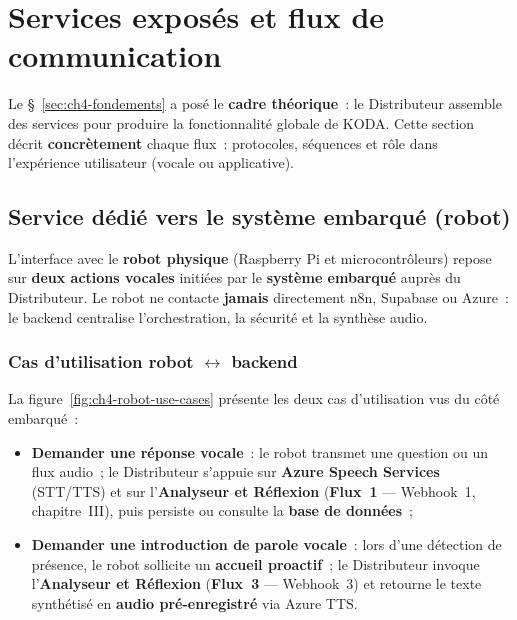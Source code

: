 \documentclass[a4paper,12pt]{report}
\begin{document}
	\section{Services exposés et flux de communication}
	\label{sec:ch4-services}
	
	Le §~\ref{sec:ch4-fondements} a posé le \textbf{cadre théorique}~: le Distributeur
	assemble des services pour produire la fonctionnalité globale de KODA. Cette section
	décrit \textbf{concrètement} chaque flux~: protocoles, séquences et rôle dans
	l'expérience utilisateur (vocale ou applicative).
	
	\subsection{Service dédié vers le système embarqué (robot)}
	\label{sec:ch4-robot-interaction}
	
	L'interface avec le \textbf{robot physique} (Raspberry Pi et microcontrôleurs) repose
	sur \textbf{deux actions vocales} initiées par le \textbf{système embarqué} auprès du
	Distributeur. Le robot ne contacte \textbf{jamais} directement n8n, Supabase ou Azure~:
	le backend centralise l'orchestration, la sécurité et la synthèse audio.
	
	\subsubsection{Cas d'utilisation robot $\leftrightarrow$ backend}
	
	La figure~\ref{fig:ch4-robot-use-cases} présente les deux cas d'utilisation vus du
	côté embarqué~:
	\begin{itemize}[noitemsep]
		\item \textbf{Demander une réponse vocale}~: le robot transmet une question ou un
		flux audio~; le Distributeur s'appuie sur \textbf{Azure Speech Services} (STT/TTS)
		et sur l'\textbf{Analyseur et Réflexion} (\textbf{Flux~1} --- Webhook~1, chapitre~III),
		puis persiste ou consulte la \textbf{base de données}~;
		\item \textbf{Demander une introduction de parole vocale}~: lors d'une détection de
		présence, le robot sollicite un \textbf{accueil proactif}~; le Distributeur invoque
		l'\textbf{Analyseur et Réflexion} (\textbf{Flux~3} --- Webhook~3) et retourne le texte
		synthétisé en \textbf{audio pré-enregistré} via Azure TTS.
	\end{itemize}
	
\end{document}
